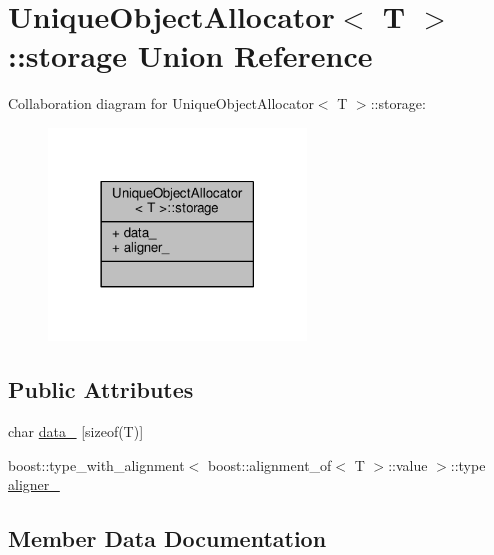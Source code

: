 \hypertarget{union_unique_object_allocator_1_1storage}{}\section{Unique\+Object\+Allocator$<$ T $>$\+:\+:storage Union Reference}
\label{union_unique_object_allocator_1_1storage}


Collaboration diagram for Unique\+Object\+Allocator$<$ T $>$\+:\+:storage\+:
\nopagebreak
\begin{figure}[H]
\begin{center}
\leavevmode
\includegraphics[width=194pt]{union_unique_object_allocator_1_1storage__coll__graph}
\end{center}
\end{figure}
\subsection*{Public Attributes}
\begin{DoxyCompactItemize}
\item 
char \mbox{\hyperlink{union_unique_object_allocator_1_1storage_a47f94c663b1a8e6a80c265b8f62f7e75}{data\+\_\+}} \mbox{[}sizeof(T)\mbox{]}
\item 
boost\+::type\+\_\+with\+\_\+alignment$<$ boost\+::alignment\+\_\+of$<$ T $>$\+::value $>$\+::type \mbox{\hyperlink{union_unique_object_allocator_1_1storage_aa2e3c17267c1d8d6e04abb5a3e9e0e61}{aligner\+\_\+}}
\end{DoxyCompactItemize}


\subsection{Member Data Documentation}
\mbox{\label{union_unique_object_allocator_1_1storage_aa2e3c17267c1d8d6e04abb5a3e9e0e61}} 
